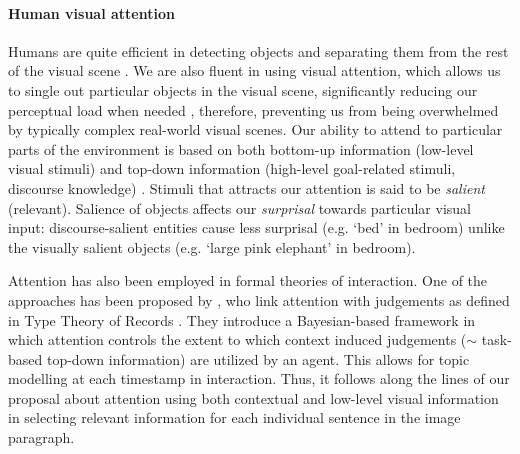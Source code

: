 \documentclass[11pt,a4paper]{article}
\begin{document}
\paragraph{Human visual attention}
Humans are quite efficient in detecting objects and separating them from the rest of the visual scene \cite{Ullman87}. We are also fluent in using visual attention, which allows us to single out particular objects in the visual scene, significantly reducing our perceptual load when needed \cite{Lavie04}, therefore, preventing us from being overwhelmed by typically complex real-world visual scenes.
Our ability to attend to particular parts of the environment is based on both bottom-up information (low-level visual stimuli) and top-down information (high-level goal-related stimuli, discourse knowledge) \cite{Zarcone2016}.
Stimuli that attracts our attention is said to be \textit{salient} (relevant). Salience of objects affects our \textit{surprisal} towards particular visual input: discourse-salient entities cause less surprisal (e.g. `bed' in bedroom) unlike the visually salient objects (e.g. `large pink elephant' in bedroom).

Attention has also been employed in formal theories of interaction. One of the approaches has been proposed by , who link attention with judgements as defined in Type Theory of Records \cite{Cooper08typetheory}.
They introduce a Bayesian-based framework in which attention controls the extent to which context induced judgements ($\sim$ task-based top-down information) are utilized by an agent. This allows for topic modelling at each timestamp in interaction.  Thus, it follows along the lines of our proposal about attention using both contextual and low-level visual information in selecting relevant information for each individual sentence in the image paragraph.
\end{document}
